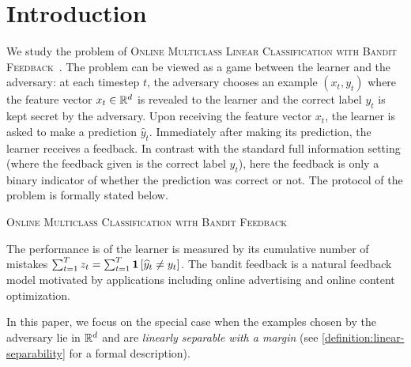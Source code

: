 \section{Introduction}
\label{section:introduction}

We study the problem of \textsc{Online Multiclass Linear Classification with
Bandit Feedback}~\citep{Kakade-Shalev-Shwartz-Tewari-2008}. The problem can be
viewed as a game between the learner and the adversary: at each timestep $t$,
the adversary chooses an example $(x_t, y_t)$ where the feature vector $x_t \in
\mathbb{R}^d$ is revealed to the learner and the correct label $y_t$ is kept secret by
the adversary. Upon receiving the feature vector $x_t$, the learner is asked to
make a prediction $\widehat{y}_t$. Immediately after making its prediction, the
learner receives a feedback. In contrast with the standard full information
setting (where the feedback given is the correct label $y_t$), here the feedback
is only a binary indicator of whether the prediction was correct or not. The
protocol of the problem is formally stated below.

\begin{algorithm}[h]
\caption{\textsc{Online Multiclass Classification with Bandit Feedback}
\label{algorithm:game-protocol}}
\begin{algorithmic}[1]
{
\ENDFOR
}
\end{algorithmic}
\end{algorithm}

The performance is of the learner is measured by its cumulative number of
mistakes $\sum_{t=1}^T z_t = \sum_{t=1}^T \mathbf{1}\left[\widehat y_t \neq y_t \right]$.
The bandit feedback is a natural feedback model motivated by applications
including online advertising and online content optimization.

In this paper, we focus on the special case when the examples chosen by the
adversary lie in $\mathbb{R}^d$ and are \emph{linearly separable with a margin} (see
\autoref{definition:linear-separability} for a formal description).

